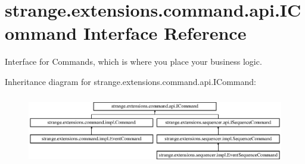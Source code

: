 \hypertarget{interfacestrange_1_1extensions_1_1command_1_1api_1_1_i_command}{\section{strange.\-extensions.\-command.\-api.\-I\-Command Interface Reference}
\label{interfacestrange_1_1extensions_1_1command_1_1api_1_1_i_command}
}


Interface for Commands, which is where you place your business logic.  


Inheritance diagram for strange.\-extensions.\-command.\-api.\-I\-Command\-:\begin{figure}[H]
\begin{center}
\leavevmode
\includegraphics[height=3.102493cm]{interfacestrange_1_1extensions_1_1command_1_1api_1_1_i_command}
\end{center}
\end{figure}
